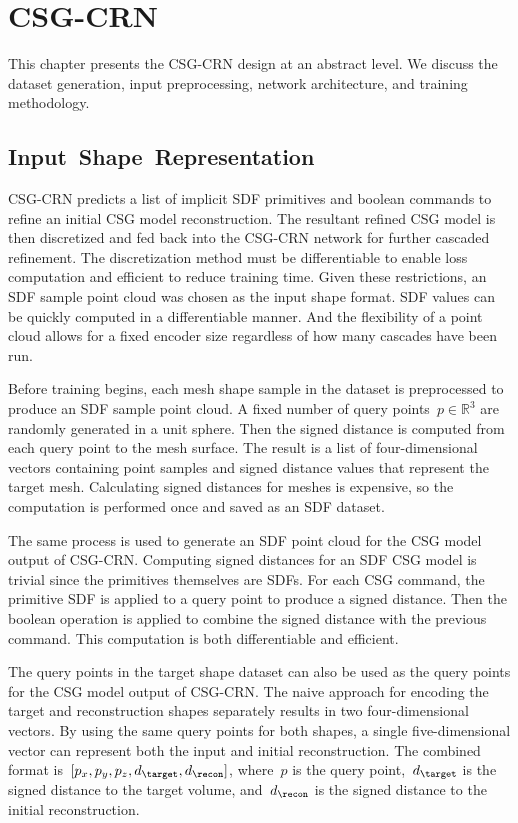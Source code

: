 
\chapter{CSG-CRN}
\label{chap:csg_crn}

This chapter presents the CSG-CRN design at an abstract level. We discuss the dataset generation, input preprocessing, network architecture, and training methodology.

\section{Input~Shape~Representation}
\label{sec:input_shape_representation}

CSG-CRN predicts a list of implicit SDF primitives and boolean commands to refine an initial CSG model reconstruction. The resultant refined CSG model is then discretized and fed back into the CSG-CRN network for further cascaded refinement. The discretization method must be differentiable to enable loss computation and efficient to reduce training time. Given these restrictions, an SDF sample point cloud was chosen as the input shape format. SDF values can be quickly computed in a differentiable manner. And the flexibility of a point cloud allows for a fixed encoder size regardless of how many cascades have been run.

Before training begins, each mesh shape sample in the dataset is preprocessed to produce an SDF sample point cloud. A fixed number of query points~$p \in \mathbb{R}^3$ are randomly generated in a unit sphere. Then the signed distance is computed from each query point to the mesh surface. The result is a list of four-dimensional vectors containing point samples and signed distance values that represent the target mesh. Calculating signed distances for meshes is expensive, so the computation is performed once and saved as an SDF dataset.

The same process is used to generate an SDF point cloud for the CSG model output of CSG-CRN. Computing signed distances for an SDF CSG model is trivial since the primitives themselves are SDFs. For each CSG command, the primitive SDF is applied to a query point to produce a signed distance. Then the boolean operation is applied to combine the signed distance with the previous command. This computation is both differentiable and efficient.

The query points in the target shape dataset can also be used as the query points for the CSG model output of CSG-CRN. The naive approach for encoding the target and reconstruction shapes separately results in two four-dimensional vectors. By using the same query points for both shapes, a single five-dimensional vector can represent both the input and initial reconstruction. The combined format is~$[p_x, p_y, p_z, d_{\target}, d_{\recon}]$, where~$p$ is the query point,~$d_{\target}$ is the signed distance to the target volume, and~$d_{\recon}$ is the signed distance to the initial reconstruction.

